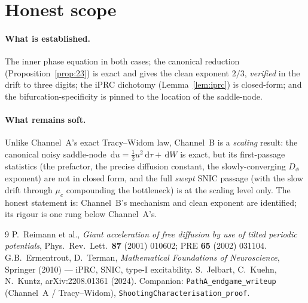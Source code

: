 \documentclass[11pt]{article}
\theoremstyle{remark}
\newcommand{\dd}{\,\mathrm{d}}
\begin{document}
\section{Honest scope}

\paragraph{What is established.} The inner phase equation in both cases; the canonical
reduction (Proposition~\ref{prop:23}) is exact and gives the clean exponent $2/3$,
\emph{verified} in the drift to three digits; the iPRC dichotomy (Lemma~\ref{lem:iprc}) is
closed-form; and the bifurcation-specificity is pinned to the location of the saddle-node.

\paragraph{What remains soft.} Unlike Channel~A's exact Tracy--Widom law, Channel~B is a
\emph{scaling} result: the canonical noisy saddle-node $\dd u=\tfrac12u^2\dd\tau+\dd W$ is
exact, but its first-passage statistics (the prefactor, the precise diffusion constant,
the slowly-converging $D_\phi$ exponent) are not in closed form, and the full \emph{swept}
SNIC passage (with the slow drift through $\mu_c$ compounding the bottleneck) is at the
scaling level only. The honest statement is: Channel~B's mechanism and clean exponent are
identified; its rigour is one rung below Channel~A's.

\begin{thebibliography}{9}
 P.~Reimann et al., \emph{Giant acceleration of free diffusion by use of
tilted periodic potentials}, Phys.\ Rev.\ Lett.\ \textbf{87} (2001) 010602; PRE
\textbf{65} (2002) 031104.
 G.B.~Ermentrout, D.~Terman, \emph{Mathematical Foundations of Neuroscience},
Springer (2010) --- iPRC, SNIC, type-I excitability.
 S.~Jelbart, C.~Kuehn, N.~Kuntz, arXiv:2208.01361 (2024).
 Companion: \texttt{PathA\_endgame\_writeup} (Channel~A / Tracy--Widom),
\texttt{ShootingCharacterisation\_proof}.
\end{thebibliography}
\end{document}
